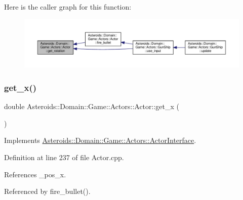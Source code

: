 Here is the caller graph for this function\+:\nopagebreak
\begin{figure}[H]
\begin{center}
\leavevmode
\includegraphics[width=350pt]{classAsteroids_1_1Domain_1_1Game_1_1Actors_1_1Actor_afa2ca9372ddf8f08de11682dae43840f_icgraph}
\end{center}
\end{figure}
\mbox{\label{classAsteroids_1_1Domain_1_1Game_1_1Actors_1_1Actor_a6b56087b412883601fce5af07d67bd50}} 
\subsubsection{\texorpdfstring{get\+\_\+x()}{get\_x()}}
{\footnotesize\ttfamily double Asteroids\+::\+Domain\+::\+Game\+::\+Actors\+::\+Actor\+::get\+\_\+x (\begin{DoxyParamCaption}{ }\end{DoxyParamCaption})\hspace{0.3cm}{\ttfamily [virtual]}}



Implements \hyperlink{classAsteroids_1_1Domain_1_1Game_1_1Actors_1_1ActorInterface_a446ca9de79b6f06dafa4986133eb0c17}{Asteroids\+::\+Domain\+::\+Game\+::\+Actors\+::\+Actor\+Interface}.



Definition at line 237 of file Actor.\+cpp.



References \+\_\+pos\+\_\+x.



Referenced by fire\+\_\+bullet().


